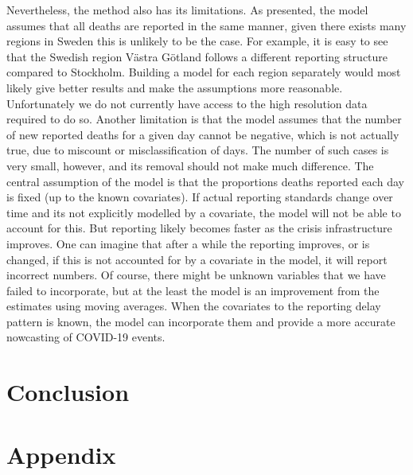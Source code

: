 \documentclass[a4paper,11pt,article,oneside,openany,american]{memoir}
\begin{document}
Nevertheless, the method also has its limitations. As presented, the model assumes that all deaths are reported in the same manner, given there exists many regions in Sweden this is unlikely to be the case. For example, it is easy to see that the Swedish region Västra Götland follows a different reporting structure compared to Stockholm. Building a model for each region separately would most likely give better results and make the assumptions more reasonable. Unfortunately we do not currently have access to the high resolution data required to do so. Another limitation is that the model assumes that the number of new reported deaths for a given day cannot be negative, which is not actually true, due to miscount or misclassification of days. The number of such cases is very small, however, and its removal should not make much difference. The central assumption of the model is that the proportions deaths reported each day is fixed (up to the known covariates). If actual reporting standards change over time and its not explicitly modelled by a covariate, the model will not be able to account for this. But reporting likely becomes faster as the crisis infrastructure improves. One can imagine that after a while the reporting improves, or is changed, if this is not accounted for by a covariate in the model, it will report incorrect numbers. Of course, there might be unknown variables that we have failed to incorporate, but at the least the model is an improvement from the estimates using moving averages. When the covariates to the reporting delay pattern is known, the model can incorporate them and provide a more accurate nowcasting of COVID-19 events. 

\chapter{Conclusion}

\printbibliography%
\backmatter%
\appendix%
\chapter{Appendix}
%
\end{document}
